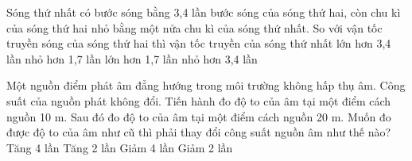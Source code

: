 \begin{ex}%
Sóng thứ nhất có bước sóng bằng 3,4 lần bước sóng của sóng thứ hai, còn chu kì của sóng thứ hai nhỏ bằng một nửa chu kì của sóng thứ nhất. So với vận tốc truyền sóng của sóng thứ hai thì vận tốc truyền của sóng thứ nhất
\choice
{lớn hơn 3,4 lần}
{nhỏ hơn 1,7 lần}
{\True lớn hơn 1,7 lần}
{nhỏ hơn 3,4 lần}
\end{ex} 
\begin{ex}%
Một nguồn điểm phát âm đẳng hướng trong môi trường không hấp thụ âm. Công suất của nguồn phát không đổi. Tiến hành đo độ to của âm tại một điểm cách nguồn 10 m. Sau đó đo độ to của âm tại một điểm cách nguồn 20 m. Muốn đo được độ to của âm như cũ thì phải thay đổi công suất nguồn âm như thế nào?
\choice
{\True Tăng 4 lần}
{Tăng 2 lần}
{Giảm 4 lần}
{Giảm 2 lần}
\end{ex} 

